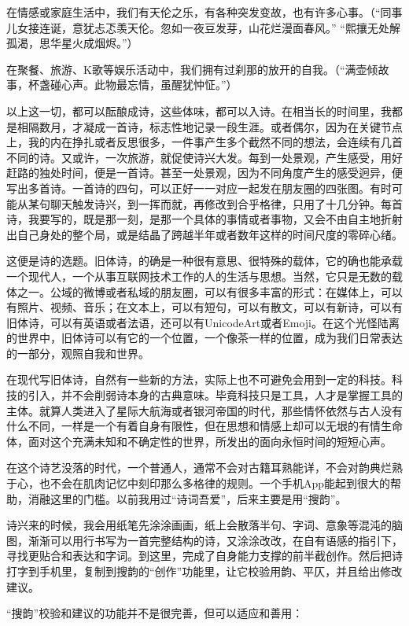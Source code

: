 \documentclass{article}
\begin{document}
在情感或家庭生活中，我们有天伦之乐，有各种突发变故，也有许多心事。（“同事儿女接连诞，意犹忐忑羡天伦。忽如一夜豆发芽，山花烂漫面春风。” “熙攘无处解孤渴，思华星火成烟烬。”）

在聚餐、旅游、K歌等娱乐活动中，我们拥有过刹那的放开的自我。（“满壶倾故事，杯盏碰心声。此物最忘情，虽醒犹忡怔。”）

以上这一切，都可以酝酿成诗，这些体味，都可以入诗。在相当长的时间里，我都是相隔数月，才凝成一首诗，标志性地记录一段生涯。或者偶尔，因为在关键节点上，我的内在挣扎或者反思很多，一件事产生多个截然不同的想法，会连续有几首不同的诗。又或许，一次旅游，就促使诗兴大发。每到一处景观，产生感受，用好赶路的独处时间，便是一首诗。甚至一处景观，因为不同角度产生的感受迥异，便写出多首诗。一首诗的四句，可以正好一一对应一起发在朋友圈的四张图。有时可能从某句聊天触发诗兴，到一挥而就，再修改到合乎格律，只用了十几分钟。每首诗，我要写的，既是那一刻，是那一个具体的事情或者事物，又会不由自主地折射出自己身处的整个局，或是结晶了跨越半年或者数年这样的时间尺度的零碎心绪。

这便是诗的选题。旧体诗，的确是一种很有意思、很特殊的载体，它的确也能承载一个现代人，一个从事互联网技术工作的人的生活与思想。当然，它只是无数的载体之一。公域的微博或者私域的朋友圈，可以有很多丰富的形式：在媒体上，可以有照片、视频、音乐；在文本上，可以有短句，可以有散文，可以有新诗，可以有旧体诗，可以有英语或者法语，还可以有UnicodeArt或者Emoji。在这个光怪陆离的世界中，旧体诗可以有它的一个位置，一个像茶一样的位置，成为我们日常表达的一部分，观照自我和世界。

在现代写旧体诗，自然有一些新的方法，实际上也不可避免会用到一定的科技。科技的引入，并不会削弱诗本身的古典意味。毕竟科技只是工具，人才是掌握工具的主体。就算人类进入了星际大航海或者银河帝国的时代，那些情怀依然与古人没有什么不同，一样是一个有着自身有限性，但在思想和情感上却可以无垠的有情生命体，面对这个充满未知和不确定性的世界，所发出的面向永恒时间的短短心声。

在这个诗艺没落的时代，一个普通人，通常不会对古籍耳熟能详，不会对韵典烂熟于心，也不会在肌肉记忆中刻印那么多格律的规则。一个手机App能起到很大的帮助，消融这里的门槛。以前我用过``诗词吾爱''，后来主要是用``搜韵''。

诗兴来的时候，我会用纸笔先涂涂画画，纸上会散落半句、字词、意象等混沌的脑图，渐渐可以用行书写为一首完整结构的诗，又涂涂改改，在自有语感的指引下，寻找更贴合和表达和字词。到这里，完成了自身能力支撑的前半截创作。然后把诗打字到手机里，复制到搜韵的``创作''功能里，让它校验用韵、平仄，并且给出修改建议。

``搜韵''校验和建议的功能并不是很完善，但可以适应和善用：
\end{document}

